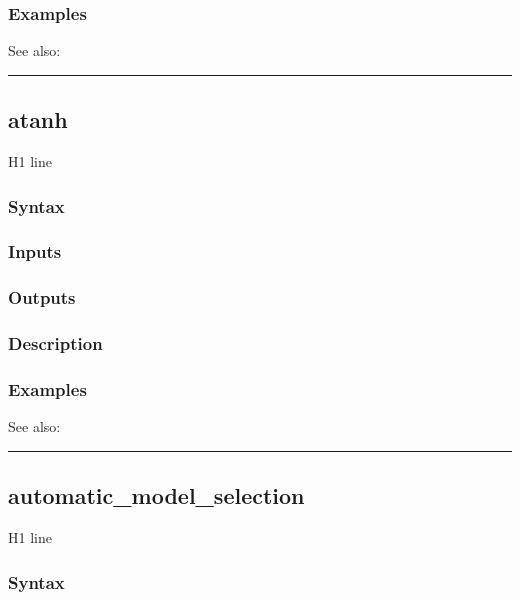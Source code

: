 \documentclass[letterpaper,10pt,english]{sphinxmanual}
\begin{document}
\subsubsection{Examples}
\label{classes/time_series/@ts/ts:id61}
See also:


\bigskip\hrule{}\bigskip



\subsection{atanh}
\label{classes/time_series/@ts/ts:atanh}\label{classes/time_series/@ts/ts:id62}
H1 line


\subsubsection{Syntax}
\label{classes/time_series/@ts/ts:id63}

\subsubsection{Inputs}
\label{classes/time_series/@ts/ts:id64}

\subsubsection{Outputs}
\label{classes/time_series/@ts/ts:id65}

\subsubsection{Description}
\label{classes/time_series/@ts/ts:id66}

\subsubsection{Examples}
\label{classes/time_series/@ts/ts:id67}
See also:


\bigskip\hrule{}\bigskip



\subsection{automatic\_model\_selection}
\label{classes/time_series/@ts/ts:automatic-model-selection}\label{classes/time_series/@ts/ts:id68}
H1 line


\subsubsection{Syntax}
\label{classes/time_series/@ts/ts:id69}
\end{document}
